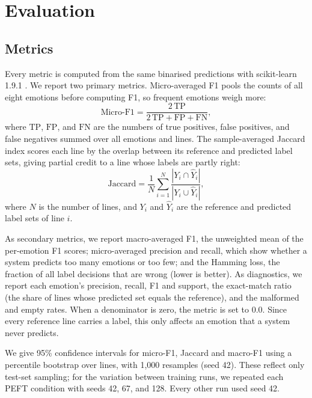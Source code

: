 \section{Evaluation}
\label{sec:evaluation}

\subsection{Metrics}
\label{sec:eval_metrics}

Every metric is computed from the same binarised predictions with scikit-learn 1.9.1 \parencite{pedregosa2011scikit}. We report two primary metrics. Micro-averaged F1 pools the counts of all eight emotions before computing F1, so frequent emotions weigh more:
\begin{equation}
    \text{Micro-F1} = \frac{2\,\mathrm{TP}}{2\,\mathrm{TP} + \mathrm{FP} + \mathrm{FN}},
    \label{eq:micro-f1}
\end{equation}
where $\mathrm{TP}$, $\mathrm{FP}$, and $\mathrm{FN}$ are the numbers of true positives, false positives, and false negatives summed over all emotions and lines. The sample-averaged Jaccard index scores each line by the overlap between its reference and predicted label sets, giving partial credit to a line whose labels are partly right:
\begin{equation}
    \text{Jaccard} = \frac{1}{N} \sum_{i=1}^{N} \frac{|Y_i \cap \hat{Y}_i|}{|Y_i \cup \hat{Y}_i|},
    \label{eq:jaccard}
\end{equation}
where $N$ is the number of lines, and $Y_i$ and $\hat{Y}_i$ are the reference and predicted label sets of line $i$.

As secondary metrics, we report macro-averaged F1, the unweighted mean of the per-emotion F1 scores; micro-averaged precision and recall, which show whether a system predicts too many emotions or too few; and the Hamming loss, the fraction of all label decisions that are wrong (lower is better). As diagnostics, we report each emotion's precision, recall, F1 and support, the exact-match ratio (the share of lines whose predicted set equals the reference), and the malformed and empty rates. When a denominator is zero, the metric is set to 0.0. Since every reference line carries a label, this only affects an emotion that a system never predicts.

We give 95\% confidence intervals for micro-F1, Jaccard and macro-F1 using a percentile bootstrap over lines, with 1,000 resamples (seed 42). These reflect only test-set sampling; for the variation between training runs, we repeated each PEFT condition with seeds 42, 67, and 128. Every other run used seed 42.

